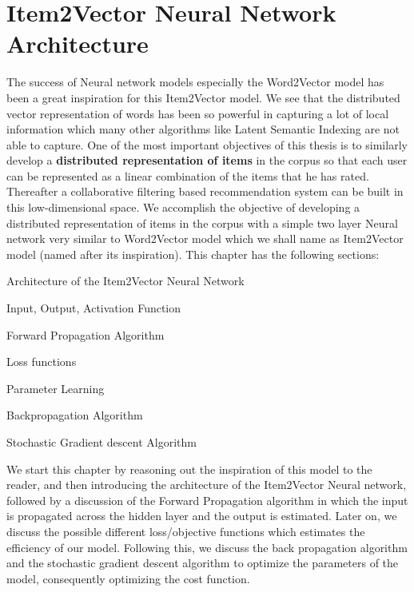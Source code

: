 \chapter{Item2Vector Neural Network Architecture}
\label{cha:1}
The success of Neural network models especially the Word2Vector model has been a great inspiration for this Item2Vector model. We see that the distributed vector representation of words has been so powerful in capturing a lot of local information which many other algorithms like Latent Semantic Indexing are not able to capture. One of the most important objectives of this thesis is to similarly develop a \textbf{distributed representation of items} in the corpus so that each user can be represented as a linear combination of the items that he has rated. Thereafter a collaborative filtering based recommendation system can be built in this low-dimensional space.  We accomplish the objective of developing a distributed representation of items in the corpus with a simple two layer Neural network very similar to Word2Vector model which we shall name as Item2Vector model (named after its inspiration). This chapter has the following sections:
\begin{myitemize}
    \item Architecture of the Item2Vector Neural Network
    \begin{myitemize}
        \item Input, Output, Activation Function
    \end{myitemize}
    \item Forward Propagation Algorithm
    \item Loss functions
    \item Parameter Learning
    \begin{myitemize}
         \item Backpropagation Algorithm
        \item Stochastic Gradient descent Algorithm
    \end{myitemize}
\end{myitemize}


We start this chapter by reasoning out the inspiration of this model to the reader, and then introducing the architecture of the Item2Vector Neural network, followed by a discussion of the Forward Propagation algorithm in which the input is propagated  across the hidden layer and the output is estimated.  Later on, we discuss the possible different loss/objective functions which estimates the efficiency of our model. Following this, we discuss the back propagation algorithm and the stochastic gradient descent algorithm to optimize the parameters of the model, consequently optimizing the cost function. 

